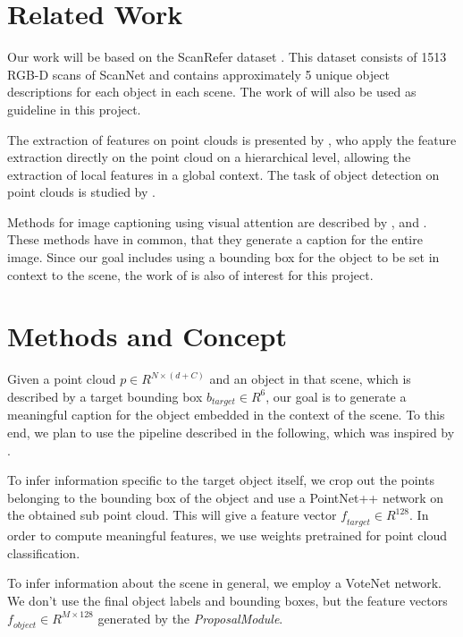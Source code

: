 \documentclass[10pt,twocolumn,letterpaper]{article}
\begin{document}
\section{Related Work}
Our work will be based on the ScanRefer dataset \cite{chen2019scanrefer}. This dataset consists of 1513 RGB-D scans of ScanNet \cite{dai2017scannet} and contains approximately 5 unique object descriptions for each object in each scene. The work of \cite{chen2019scanrefer} will also be used as guideline in this project.

The extraction of features on point clouds is presented by \cite{qi2017pointnet++}, who apply the feature extraction directly on the point cloud on a hierarchical level, allowing the extraction of local features in a global context. 
The task of object detection on point clouds is studied by \cite{qi2019deep}. 

Methods for image captioning using visual attention are described by \cite{xu2015show}, \cite{lu2017knowing} and \cite{anderson2018bottom}.
These methods have in common, that they generate a caption for the entire image.
Since our goal includes using a bounding box for the object to be set in context to the scene, the work of \cite{rohrbach2016grounding} is also of interest for this project. 

\section{Methods and Concept}

Given a point cloud $\mathit{p \in R^{N\times(d+C)}}$ and an object in that scene, which is described by a target bounding box $b_{target}\in R^6$, our goal is to generate a meaningful caption for the object embedded in the context of the scene. To this end, we plan to use the pipeline described in the following, which was inspired by \cite{anderson2018bottom}.

To infer information specific to the target object itself, we crop out the points belonging to the bounding box of the object and use a PointNet++ \cite{qi2017pointnet++} network on the obtained sub point cloud. This will give a feature vector $\mathit{f_{target}}\in R^{128}$. In order to compute meaningful features, we use weights pretrained for point cloud classification.

To infer information about the scene in general, we employ a VoteNet \cite{qi2019deep} network. We don't use the final object labels and bounding boxes, but the feature vectors $\mathit{f_{object}}\in R^{M\times128}$ generated by the \textit{ProposalModule}.
\end{document}
